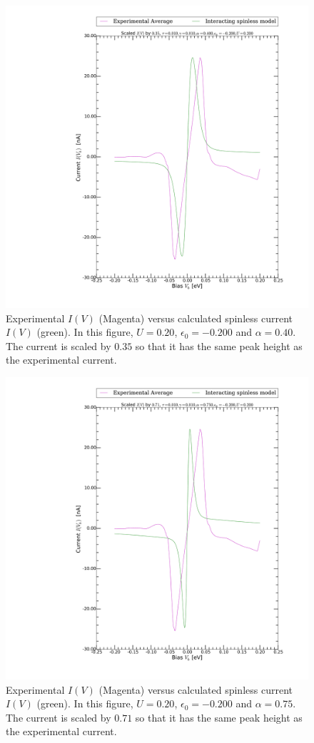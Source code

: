 \begin{figure}[h]
    \centering
    \includegraphics[width=.95\textwidth, clip=true, trim=11cm 2cm 2cm 0cm]{pdf/fit/fit_spinless_2.pdf}
    \caption{Experimental $I(V)$ (Magenta) versus calculated spinless current $I(V)$ (green). In this figure, $U=0.20$, $\epsilon_0 = -0.200$ and $\alpha=0.40$. The current is scaled by $0.35$ so that it has the same peak height as the experimental current. }
    \label{fig:fitspinless2}
\end{figure}
\begin{figure}[h]
    \centering
    \includegraphics[width=.95\textwidth, clip=true, trim=11cm 2cm 2cm 0cm]{pdf/fit/fit_spinless_3.pdf}
    \caption{Experimental $I(V)$ (Magenta) versus calculated spinless current $I(V)$ (green). In this figure, $U=0.20$, $\epsilon_0 = -0.200$ and $\alpha=0.75$. The current is scaled by $0.71$ so that it has the same peak height as the experimental current. }
    \label{fig:fitspinless3}
\end{figure}
